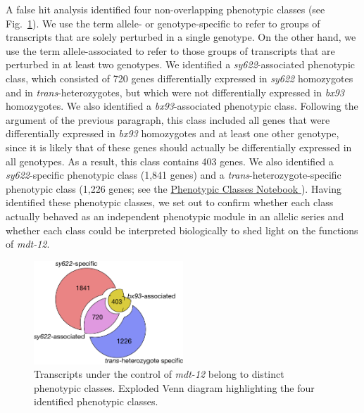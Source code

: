 \documentclass[10pt, twocolumn]{article}
\newcommand{\gene}[1]{\mbox{\emph{#1}}}
\newcommand{\dpy}{\gene{mdt-12}}
\begin{document}
A false hit analysis identified four non-overlapping phenotypic classes (see
Fig.~\ref{fig:venn}). We use the term allele- or genotype-specific to refer to
groups of transcripts that are solely perturbed in a single genotype. On the
other hand, we use the term allele-associated to refer to those groups of
transcripts that are perturbed in at least two genotypes. We identified a
\emph{sy622}-associated phenotypic class, which consisted of 720 genes
differentially expressed in \emph{sy622} homozygotes and in
\emph{trans}-heterozygotes, but which were not differentially expressed in
\emph{bx93} homozygotes. We also identified a \emph{bx93}-associated phenotypic
class. Following the argument of the previous paragraph, this class included all
genes that were differentially expressed in \emph{bx93} homozygotes and at least
one other genotype, since it is likely that of these genes should actually be
differentially expressed in all genotypes. As a result, this class contains 403
genes. We also identified a \emph{sy622}-specific phenotypic class (1,841 genes)
and a \emph{trans}-heterozygote-specific phenotypic class (1,226 genes;
see the
\href{https://wormlabcaltech.github.io/med-cafe/notebook/phenotypic_classes.html}{
Phenotypic Classes Notebook
}).
Having
identified these phenotypic classes, we set out to confirm whether each class
actually behaved as an independent phenotypic module in an allelic series and
whether each class could be interpreted biologically to shed light on the
functions of \dpy{}.


\begin{figure}
  \includegraphics[width=0.5\textwidth]{../figs/exploded_venn.pdf}
  \caption{
  Transcripts under the control of \dpy{} belong to distinct phenotypic
  classes. Exploded Venn diagram highlighting the four identified phenotypic
  classes.
  }
\label{fig:venn}
\end{figure}
\end{document}
